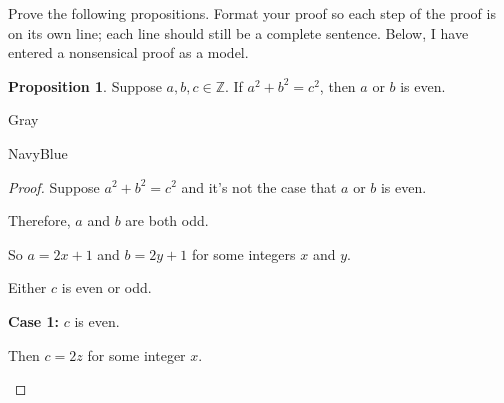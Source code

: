 \documentclass[12pt]{amsart}
\theoremstyle{named}
\newenvironment{prf}
{\medskip\begin{color}{Gray}\begin{framed}\begin{color}{NavyBlue}\begin{proof}[Proof]
\doublespacing}
{\end{proof}\end{color}\end{framed}\end{color}\medskip}
\theoremstyle{definition}
\newtheorem{proposition}{Proposition}
\newcommand{\Z}{\mathbb Z}
\begin{document}
Prove the following propositions. Format your proof so each step of the proof is on its own line; each line should still be a complete sentence. Below, I have entered a nonsensical proof as a model.

\begin{proposition}
	Suppose $a,b,c\in\Z$.
	If $a^2+b^2=c^2$, then $a$ or $b$ is even.
\end{proposition}

\begin{prf}
	\phantom{ }


		

			





			
		

	Suppose $a^2 + b^2 = c^2$ and it's 
	not the case that $a$ or $b$ is even.

	Therefore, $a$ and $b$ are both odd.

	So $a = 2x + 1$ and $b = 2y + 1$ for some integers $x$ and $y$.

	Either $c$ is even or odd.

	\textbf{Case 1:} $c$ is even.
	\begin{adjustwidth}{2em}{0em} 
		Then $c = 2z$ for some integer $x$.


\end{adjustwidth}
\end{prf}
\end{document}
